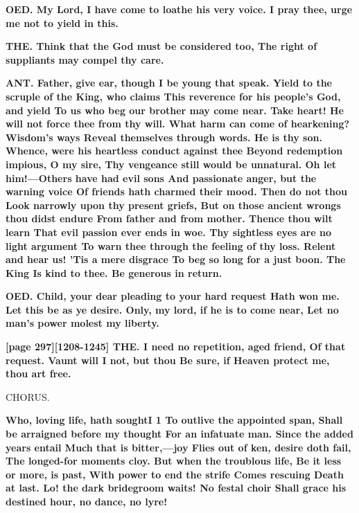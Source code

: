 \documentclass[11pt,letter]{book}
\begin{document}
\par \textbf{OED. My Lord, I have come to loathe his very voice. I pray thee, urge me not to yield in this.}
\par 

\par \textbf{THE. Think that the God must be considered too, The right of suppliants may compel thy care.}
\par 

\par \textbf{ANT. Father, give ear, though I be young that speak. Yield to the scruple of the King, who claims This reverence for his people’s God, and yield To us who beg our brother may come near. Take heart! He will not force thee from thy will. What harm can come of hearkening? Wisdom’s ways Reveal themselves through words. He is thy son. Whence, were his heartless conduct against thee Beyond redemption impious, O my sire, Thy vengeance still would be unnatural. Oh let him!—Others have had evil sons And passionate anger, but the warning voice Of friends hath charmed their mood. Then do not thou Look narrowly upon thy present griefs, But on those ancient wrongs thou didst endure From father and from mother. Thence thou wilt learn That evil passion ever ends in woe. Thy sightless eyes are no light argument To warn thee through the feeling of thy loss. Relent and hear us! ’Tis a mere disgrace To beg so long for a just boon. The King Is kind to thee. Be generous in return.}
\par 

\par \textbf{OED. Child, your dear pleading to your hard request Hath won me. Let this be as ye desire. Only, my lord, if he is to come near, Let no man’s power molest my liberty.}
\par 

\par \textbf{[page 297][1208-1245] THE. I need no repetition, aged friend, Of that request. Vaunt will I not, but thou Be sure, if Heaven protect me, thou art free.}
\par 

\par  CHORUS.

\par \textbf{Who, loving life, hath soughtI 1 To outlive the appointed span, Shall be arraigned before my thought For an infatuate man. Since the added years entail Much that is bitter,—joy Flies out of ken, desire doth fail, The longed-for moments cloy. But when the troublous life, Be it less or more, is past, With power to end the strife Comes rescuing Death at last. Lo! the dark bridegroom waits! No festal choir Shall grace his destined hour, no dance, no lyre!}
\par 
\end{document}
